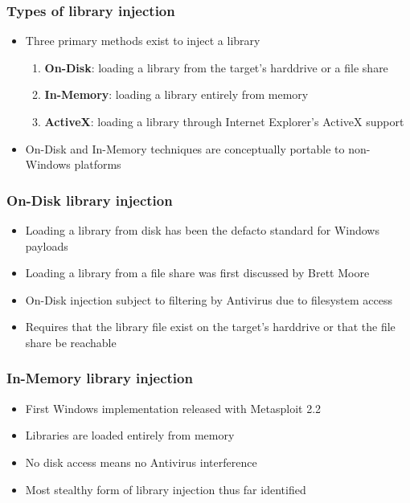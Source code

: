 \documentclass{beamer}
\newenvironment{sitemize}{\vspace{1mm}\begin{itemize}\itemsep 4pt\small}{\end{itemize}}
\newenvironment{senumerate}{\vspace{1mm}\begin{enumerate}\itemsep 4pt\small}{\end{enumerate}}
\begin{document}
\begin{frame}[t]
    \frametitle{Types of library injection}

    \begin{sitemize}
        \item Three primary methods exist to inject a library
        \begin{senumerate}
            \item \textbf{On-Disk}: loading a library from the target's
            harddrive or a file share
            \item \textbf{In-Memory}: loading a library entirely from memory
            \item \textbf{ActiveX}: loading a library through Internet
            Explorer's ActiveX support
        \end{senumerate}
        \item On-Disk and In-Memory techniques are conceptually
        portable to non-Windows platforms
    \end{sitemize}
\end{frame}

\begin{frame}[t]
    \frametitle{On-Disk library injection}

    \begin{sitemize}
        \item Loading a library from disk has been the defacto
        standard for Windows payloads
        \item Loading a library from a file share was first
        discussed by Brett Moore
    \end{sitemize}

    \pause
    \begin{sitemize}
        \item On-Disk injection subject to filtering by Antivirus due to
            filesystem access
        \item Requires that the library file exist on the target's
            harddrive or that the file share be reachable
    \end{sitemize}
\end{frame}

\begin{frame}[t]
    \frametitle{In-Memory library injection}

    \begin{sitemize}
        \item First Windows implementation released with Metasploit 2.2

        \pause
        \item Libraries are loaded entirely from memory

        \pause
        \item No disk access means no Antivirus interference

        \pause
        \item Most stealthy form of library injection thus far
        identified
    \end{sitemize}
\end{frame}
\end{document}
